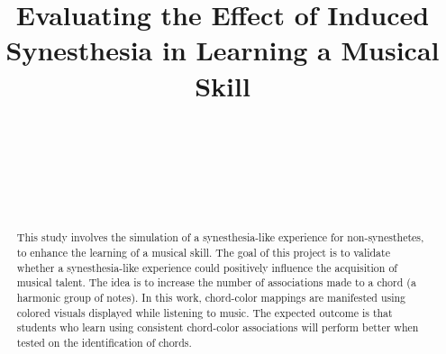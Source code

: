 \documentclass{sigchi}
\def\plaintitle{Evaluating the Effect of Induced Synesthesia in Learning a Musical Skill}
\begin{document}
\title{\plaintitle}

\author{%
  \\
  \\
  \\
  \\
  \\
}

\maketitle

\begin{abstract}
	This study involves the simulation of a synesthesia-like experience for non-synesthetes, to enhance the learning of a musical skill. The goal of this project is to validate whether a synesthesia-like experience could positively influence the acquisition of musical talent. The idea is to increase the number of associations made to a chord (a harmonic group of notes). In this work, chord-color mappings are manifested using colored visuals displayed while listening to music. The expected outcome is that students who learn using consistent chord-color associations will perform better when tested on the identification of chords.
\end{abstract}
\end{document}
